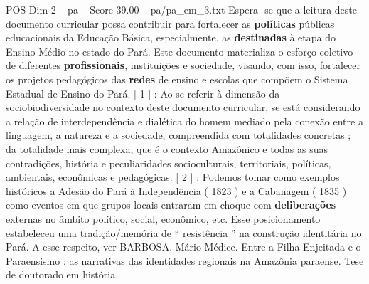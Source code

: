 \begin{textsample}{POS Dim 2 – pa – Score 39.00 – pa/pa\_em\_3.txt}
Espera -se que a leitura deste documento curricular possa contribuir para fortalecer as \textbf{políticas} públicas educacionais da Educação Básica, especialmente, as \textbf{destinadas} à etapa do Ensino Médio no estado do Pará.
Este documento materializa o esforço coletivo de diferentes \textbf{profissionais}, instituições e sociedade, visando, com isso, fortalecer os projetos pedagógicos das \textbf{redes} de ensino e escolas que compõem o Sistema Estadual de Ensino do Pará. [ 1 ] : Ao se referir à dimensão da sociobiodiversidade no contexto deste documento curricular, se está considerando a relação de interdependência e dialética do homem mediado pela conexão entre a linguagem, a natureza e a sociedade, compreendida com totalidades concretas ; da totalidade mais complexa, que é o contexto Amazônico e todas as suas contradições, história e peculiaridades socioculturais, territoriais, políticas, ambientais, econômicas e pedagógicas. [ 2 ] : Podemos tomar como exemplos históricos a Adesão do Pará à Independência ( 1823 ) e a Cabanagem ( 1835 ) como eventos em que grupos locais entraram em choque com \textbf{deliberações} externas no âmbito político, social, econômico, etc.
Esse posicionamento estabeleceu uma tradição/memória de “ resistência ” na construção identitária no Pará.
A esse respeito, ver BARBOSA, Mário Médice.
Entre a Filha Enjeitada e o Paraensismo : as narrativas das identidades regionais na Amazônia paraense.
Tese de doutorado em história.

\end{textsample}
